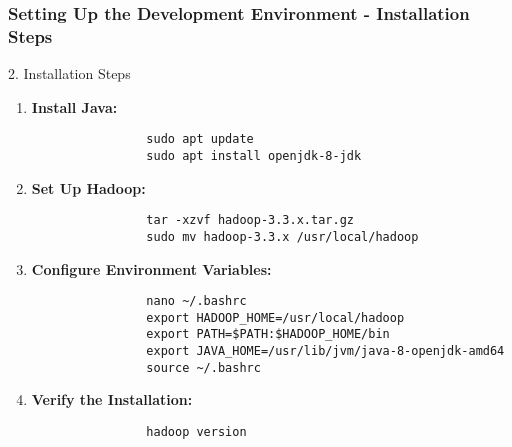 \documentclass[aspectratio=169]{beamer}
\begin{document}
\begin{frame}[fragile]
    \frametitle{Setting Up the Development Environment - Installation Steps}
    \begin{block}{2. Installation Steps}
        \begin{enumerate}
            \item \textbf{Install Java:}
                \begin{lstlisting}
                sudo apt update
                sudo apt install openjdk-8-jdk
                \end{lstlisting}
            \item \textbf{Set Up Hadoop:}
                \begin{lstlisting}
                tar -xzvf hadoop-3.3.x.tar.gz
                sudo mv hadoop-3.3.x /usr/local/hadoop
                \end{lstlisting}
            \item \textbf{Configure Environment Variables:}
                \begin{lstlisting}
                nano ~/.bashrc
                export HADOOP_HOME=/usr/local/hadoop
                export PATH=$PATH:$HADOOP_HOME/bin
                export JAVA_HOME=/usr/lib/jvm/java-8-openjdk-amd64
                source ~/.bashrc
                \end{lstlisting}
            \item \textbf{Verify the Installation:}
                \begin{lstlisting}
                hadoop version
                \end{lstlisting}
        \end{enumerate}
    \end{block}
\end{frame}
\end{document}
